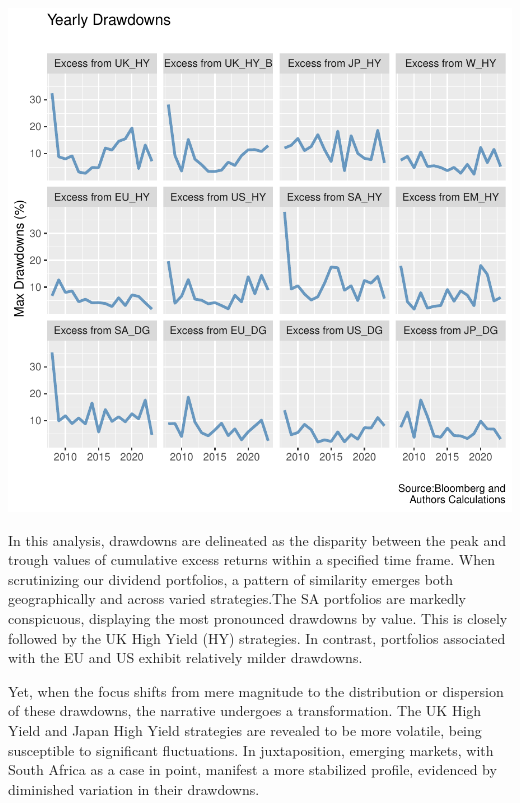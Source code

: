 \documentclass[11pt,preprint, authoryear]{elsarticle}
\let\origfigure\figure
\let\endorigfigure\endfigure
\renewenvironment{figure}[1][2] {
    \expandafter\origfigure\expandafter[H]
} {
    \endorigfigure
}
\numberwithin{equation}{section}
\numberwithin{figure}{section}
\numberwithin{table}{section}
\begin{document}
\begin{figure}[H]

\includegraphics{ThesisWriteUp_files/figure-latex/Figure2-1} \hfill{}

\caption{Rolling 3 Year Returns \label{fig2}}\label{fig:Figure2}
\end{figure}

In this analysis, drawdowns are delineated as the disparity between the
peak and trough values of cumulative excess returns within a specified
time frame. When scrutinizing our dividend portfolios, a pattern of
similarity emerges both geographically and across varied strategies.The
SA portfolios are markedly conspicuous, displaying the most pronounced
drawdowns by value. This is closely followed by the UK High Yield (HY)
strategies. In contrast, portfolios associated with the EU and US
exhibit relatively milder drawdowns.

Yet, when the focus shifts from mere magnitude to the distribution or
dispersion of these drawdowns, the narrative undergoes a transformation.
The UK High Yield and Japan High Yield strategies are revealed to be
more volatile, being susceptible to significant fluctuations. In
juxtaposition, emerging markets, with South Africa as a case in point,
manifest a more stabilized profile, evidenced by diminished variation in
their drawdowns.
\end{document}
